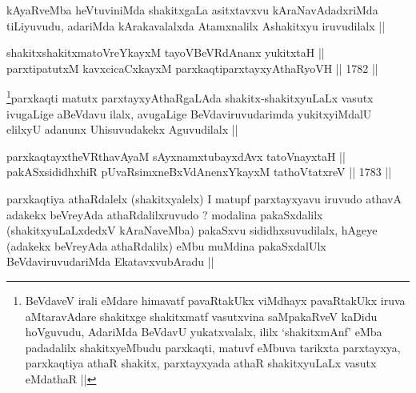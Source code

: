 \begin{artha}
kAyaRveMba heVtuviniMda shakitxgaLa asitxtavxvu kAraNavAdadxriMda
tiLiyuvudu, adariMda kArakavalalxda Atamxnalilx Ashakitxyu iruvudilalx ||
\end{artha}


\begin{shl}
shakitxshakitxmatoVreYkayxM tayoVBeVRdAnanx yukitxtaH || \\
parxtipatutxM kavxcicaCxkayxM parxkaqtiparxtayxyAthaRyoVH ||  1782 ||  
\end{shl}

\begin{artha}
\footnote[1]{BeVdaveV irali eMdare himavatf pavaRtakUkx viMdhayx
  pavaRtakUkx iruva aMtaravAdare shakitxge shakitxmatf vasutxvina
  saMpakaRveV kaDidu hoVguvudu, AdariMda BeVdavU yukatxvalalx, ililx
  `shakitxmAnf' eMba padadalilx shakitxyeMbudu parxkaqti, matuvf
  eMbuva tarikxta parxtayxya, parxkaqtiya athaR shakitx, parxtayxyada
  athaR shakitxyuLaLx vasutx eMdathaR ||}parxkaqti matutx parxtayxyAthaRgaLAda
shakitx-shakitxyuLaLx vasutx ivugaLige aBeVdavu ilalx, avugaLige
BeVdaviruvudarimda yukitxyiMdalU elilxyU adanunx Uhisuvudakekx
Aguvudilalx ||
\end{artha}


\begin{shl}
parxkaqtayxtheVR\s thavA\s yaM sAyxnamxtubayxdAvx tatoV\s nayxtaH ||  \\
pakASxsididhxhiR pUvaRsimxneBxVdAnenxYkayxM tathoVtatxreV ||  1783 ||  
\end{shl}

\begin{artha}
parxkaqtiya athaRdalelx (shakitxyalelx) I matupf parxtayxyavu iruvudo
athavA adakekx beVreyAda athaRdalilxruvudo ? modalina pakaSxdalilx
(shakitxyuLaLxdedxV kAraNaveMba) pakaSxvu sididhxsuvudilalx, hAgeye
(adakekx beVreyAda athaRdalilx) eMbu muMdina pakaSxdalUlx
BeVdaviruvudariMda EkatavxvubAradu ||
\end{artha}




